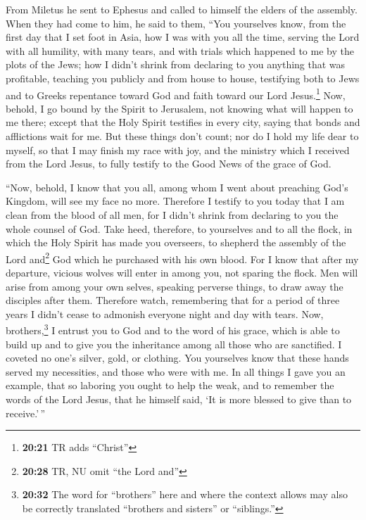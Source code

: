 \begin{paracol}{2}
\begin{otherlanguage}{english}
 From Miletus he sent to Ephesus and called to himself
the elders of the assembly.  When they had come to him,
he said to them, ``You yourselves know, from the first day that I set
foot in Asia, how I was with you all the time,  serving
the Lord with all humility, with many tears, and with trials which
happened to me by the plots of the Jews;  how I didn't
shrink from declaring to you anything that was profitable, teaching you
publicly and from house to house,  testifying both to
Jews and to Greeks repentance toward God and faith toward our Lord
Jesus.\footnote{\textbf{20:21} TR adds ``Christ''}  Now,
behold, I go bound by the Spirit to Jerusalem, not knowing what will
happen to me there;  except that the Holy Spirit
testifies in every city, saying that bonds and afflictions wait for me.
 But these things don't count; nor do I hold my life dear
to myself, so that I may finish my race with joy, and the ministry which
I received from the Lord Jesus, to fully testify to the Good News of the
grace of God.

 ``Now, behold, I know that you all, among whom I went
about preaching God's Kingdom, will see my face no more. 
Therefore I testify to you today that I am clean from the blood of all
men,  for I didn't shrink from declaring to you the whole
counsel of God.  Take heed, therefore, to yourselves and
to all the flock, in which the Holy Spirit has made you overseers, to
shepherd the assembly of the Lord and\footnote{\textbf{20:28} TR, NU
  omit ``the Lord and''} God which he purchased with his own blood.
 For I know that after my departure, vicious wolves will
enter in among you, not sparing the flock.  Men will
arise from among your own selves, speaking perverse things, to draw away
the disciples after them.  Therefore watch, remembering
that for a period of three years I didn't cease to admonish everyone
night and day with tears.  Now, brothers,\footnote{\textbf{20:32}
  The word for ``brothers'' here and where the context allows may also
  be correctly translated ``brothers and sisters'' or ``siblings.''} I
entrust you to God and to the word of his grace, which is able to build
up and to give you the inheritance among all those who are sanctified.
 I coveted no one's silver, gold, or clothing.
 You yourselves know that these hands served my
necessities, and those who were with me.  In all things I
gave you an example, that so laboring you ought to help the weak, and to
remember the words of the Lord Jesus, that he himself said, `It is more
blessed to give than to receive.'\,''


\end{otherlanguage}
\end{paracol}
